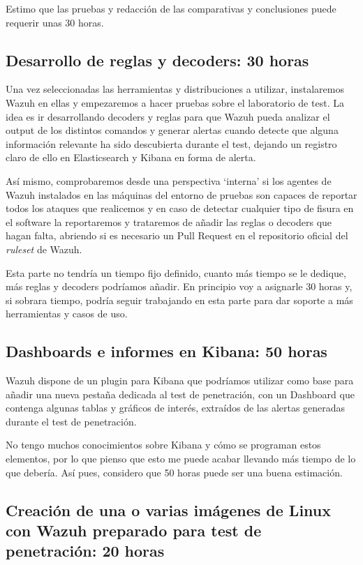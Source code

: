 Estimo que las pruebas y redacción de las comparativas y conclusiones puede requerir unas 30 horas. 

\subsection{Desarrollo de reglas y decoders: 30 horas}

Una vez seleccionadas las herramientas y distribuciones a utilizar, instalaremos Wazuh en ellas y empezaremos a hacer pruebas sobre el laboratorio de test. La idea es ir desarrollando decoders y reglas para que Wazuh pueda analizar el output de los distintos comandos y generar alertas cuando detecte que alguna información relevante ha sido descubierta durante el test, dejando un registro claro de ello en Elasticsearch y Kibana en forma de alerta.

Así mismo, comprobaremos desde una perspectiva `interna' si los agentes de Wazuh instalados en las máquinas del entorno de pruebas son capaces de reportar todos los ataques que realicemos y en caso de detectar cualquier tipo de fisura en el software la reportaremos y trataremos de añadir las reglas o decoders que hagan falta, abriendo si es necesario un \gls{Pull Request} en el repositorio oficial del \textit{ruleset} de Wazuh.

Esta parte no tendría un tiempo fijo definido, cuanto más tiempo se le dedique, más reglas y decoders podríamos añadir. En principio voy a asignarle 30 horas y, si sobrara tiempo, podría seguir trabajando en esta parte para dar soporte a más herramientas y casos de uso.

\subsection{Dashboards e informes en Kibana: 50 horas}

Wazuh dispone de un plugin para Kibana que podríamos utilizar como base para añadir una nueva pestaña dedicada al test de penetración, con un Dashboard que contenga algunas tablas y gráficos de interés, extraídos de las alertas generadas durante el test de penetración.

No tengo muchos conocimientos sobre Kibana y cómo se programan estos elementos, por lo que pienso que esto me puede acabar llevando más tiempo de lo que debería. Así pues, considero que 50 horas puede ser una buena estimación. 

\subsection{Creación de una o varias imágenes de Linux con Wazuh preparado para test de penetración: 20 horas}

